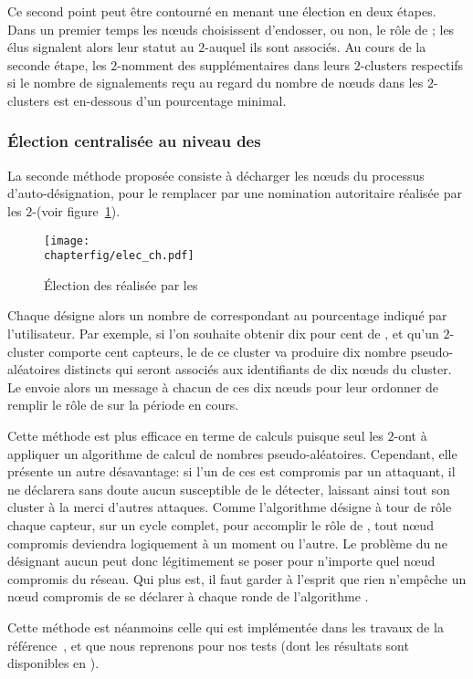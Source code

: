 Ce second point peut être contourné en menant une élection en deux étapes.
Dans un premier temps les nœuds choisissent d'endosser, ou non, le rôle de \cn; les \cns élus signalent alors leur statut au $2$-\CH auquel ils sont associés.
Au cours de la seconde étape, les $2$-\CH nomment des \cns supplémentaires dans leurs $2$-clusters respectifs si le nombre de signalements reçu au regard du nombre de nœuds dans les $2$-clusters est en-dessous d'un pourcentage minimal.

        \subsubsection{Élection centralisée au niveau des \chs}
        La seconde méthode proposée consiste à décharger les nœuds du processus d'auto-désignation, pour le remplacer par une nomination autoritaire réalisée par les $2$-\chs (voir figure~\ref{sa:fig:elecch}).
\begin{figure}[ht]
    \centering
    \texttt{[image: \\chapterfig/elec\_ch.pdf]}
    \caption{Élection des \cns réalisée par les \ch}\label{sa:fig:elecch}
\end{figure}
Chaque \CH désigne alors un nombre de \cns correspondant au pourcentage indiqué par l'utilisateur.
Par exemple, si l'on souhaite obtenir dix pour cent de \cns, et qu'un $2$-cluster comporte cent capteurs, le \CH de ce cluster va produire dix nombre pseudo-aléatoires distincts qui seront associés aux identifiants de dix nœuds du cluster.
Le \CH envoie alors un message à chacun de ces dix nœuds pour leur ordonner de remplir le rôle de \cn sur la période en cours.

Cette méthode est plus efficace en terme de calculs puisque seul les $2$-\CH ont à appliquer un algorithme de calcul de nombres pseudo-aléatoires.
Cependant, elle présente un autre désavantage: si l'un de ces \CH est compromis par un attaquant, il ne déclarera sans doute aucun \cn susceptible de le détecter, laissant ainsi tout son cluster à la merci d'autres attaques.
Comme l'algorithme \leach désigne à tour de rôle chaque capteur, sur un cycle complet, pour accomplir le rôle de \CH, tout nœud compromis deviendra logiquement \CH à un moment ou l'autre.
Le problème du \CH ne désignant aucun \cn peut donc légitimement se poser pour n'importe quel nœud compromis du réseau.
Qui plus est, il faut garder à l'esprit que rien n'empêche un nœud compromis de se déclarer \ch à chaque ronde de l'algorithme \leach.

Cette méthode est néanmoins celle qui est implémentée dans les travaux de la référence~\cite{GMT12}, et que nous reprenons pour nos tests (dont les résultats sont disponibles en ).

